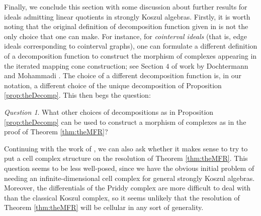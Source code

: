 \documentclass[10pt]{amsart}
\theoremstyle{definition}
\theoremstyle{remark}
\newtheorem{the context}[theorem]{The Context}
\newtheorem{question}[theorem]{Question}
\numberwithin{equation}{theorem}
\numberwithin{equation}{section}
\begin{document}
Finally, we conclude this section with some discussion about further results for ideals admitting linear quotients in strongly Koszul algebras. Firstly, it is worth noting that the original definition of decomposition function given in \cite{herzog2002resolutions} is not the only choice that one can make. For instance, for \emph{cointerval ideals} (that is, edge ideals corresponding to cointerval graphs), one can formulate a different definition of a decomposition function to construct the morphism of complexes appearing in the iterated mapping cone construction; see Section $4$ of work by Dochtermann and Mohammadi \cite{dochtermann2014cellular}. The choice of a different decomposition function is, in our notation, a different choice of the unique decomposition of Proposition \ref{prop:theDecomp}. This then begs the question:

\begin{question}
What other choices of decompositions as in Proposition \ref{prop:theDecomp} can be used to construct a morphism of complexes as in the proof of Theorem \ref{thm:theMFR}?
\end{question}

Continuing with the work of \cite{dochtermann2014cellular}, we can also ask whether it makes sense to try to put a cell complex structure on the resolution of Theorem \ref{thm:theMFR}. This question seems to be less well-posed, since we have the obvious initial problem of needing an infinite-dimensional cell complex for general strongly Koszul algebras. Moreover, the differentials of the Priddy complex are more difficult to deal with than the classical Koszul complex, so it seems unlikely that the resolution of Theorem \ref{thm:theMFR} will be cellular in any sort of generality. 



\end{document}
